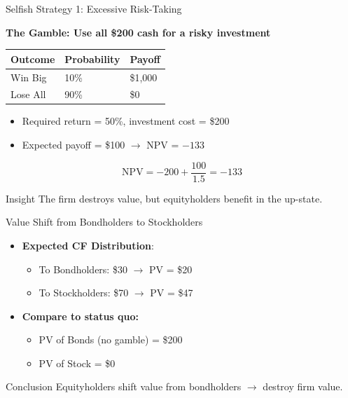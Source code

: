 \begin{frame}{Selfish Strategy 1: Excessive Risk-Taking}
	
	\textbf{The Gamble: Use all \$200 cash for a risky investment}
	
	\begin{table}
		\centering
		\begin{tabular}{lll}
			\toprule
			Outcome     & Probability & Payoff \\ \midrule
			Win Big     & 10\%        & \$1,000 \\
			Lose All    & 90\%        & \$0 \\ \bottomrule
		\end{tabular}
	\end{table}
	
	\vspace{0.2cm}
	\begin{itemize}
		\item Required return = 50\%, investment cost = \$200
		\item Expected payoff = \$100 $\rightarrow$ NPV = \(-133\)
	\end{itemize}
	
	\vspace{0.2cm}
	\begin{equation*}
		\text{NPV} = -200 + \frac{100}{1.5} = -133
	\end{equation*}
	
	\begin{alertblock}{Insight}
		The firm destroys value, but equityholders benefit in the up-state.
	\end{alertblock}
	
\end{frame}

\begin{frame}{Value Shift from Bondholders to Stockholders}
	
	\begin{itemize}
		\item \textbf{Expected CF Distribution}:
		\begin{itemize}
			\item To Bondholders: \$30 $\rightarrow$ PV = \$20
			\item To Stockholders: \$70 $\rightarrow$ PV = \$47
		\end{itemize}
		
		\item \textbf{Compare to status quo:}
		\begin{itemize}
			\item PV of Bonds (no gamble) = \$200
			\item PV of Stock = \$0
		\end{itemize}
	\end{itemize}
	
	\begin{alertblock}{Conclusion}
		Equityholders shift value from bondholders $\rightarrow$ destroy firm value.
	\end{alertblock}
	
\end{frame}

